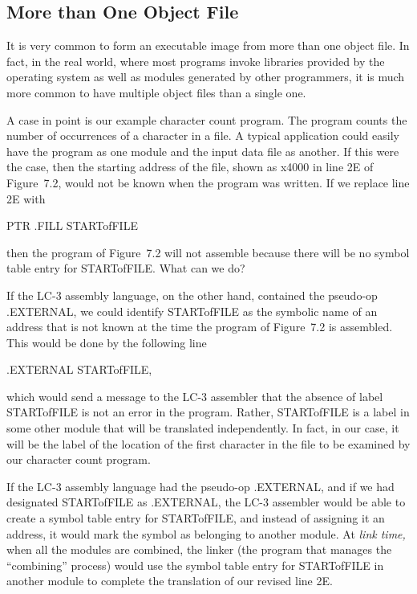 \documentclass{patt}
\begin{document}
\subsection{More than One Object File}
\label{sec:obj_file}
 It is very common to form an
executable image from more than one object file. In fact, in the real
world, where most programs invoke libraries provided by the operating
system as well as modules generated by other programmers, it is much
more common to have multiple object files than a single one.

A case in point is our example character count program. The program
counts the number of occurrences of a character in a file. A typical
application could easily have the program as one module and the input
data file as another. If this were the case, then the starting address
of the file, shown as x4000 in line 2E of Figure~7.2, would not be
known when the program was written. If we replace line 2E with
\begin{colorverbatim}
                   PTR  .FILL   STARTofFILE
\end{colorverbatim}
then the program of Figure~7.2 will not assemble because there will
be no symbol table entry for STARTofFILE.  What can we do?

If the LC-3 assembly language, on the other hand, contained the
\hbox{pseudo-op} .EXTERNAL, we could identify STARTofFILE as the symbolic
name of an address that is not known at the time the program of
Figure~7.2 is assembled.  This would be done by the following line
\begin{colorverbatim}
                   .EXTERNAL    STARTofFILE,
\end{colorverbatim}
which would send a message to the LC-3 assembler that the absence of
label STARTofFILE is not an error in the program. Rather, STARTofFILE
is a label in some other module that will be translated independently.
In fact, in our case, it will be the label of the location of the
first character in the file to be examined by our character count
program.

If the LC-3 assembly language had the pseudo-op .EXTERNAL, and if we
had designated STARTofFILE as .EXTERNAL, the LC-3 assembler would be able to
create a symbol table entry for STARTofFILE, and instead of assigning
it an address, it would mark the symbol as belonging to another
module.  At {\em link time,} when all the modules are combined, the
linker (the program that manages the ``combining'' process) would use
the symbol table entry for STARTofFILE in  another
module to complete the translation of our revised line 2E.
\end{document}
